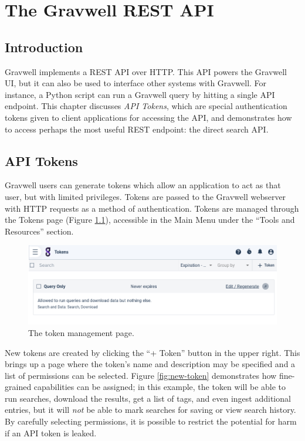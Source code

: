 \chapter{The Gravwell REST API}
\section{Introduction}
Gravwell implements a REST API over HTTP. This API powers the Gravwell UI, but it can also be used to interface other systems with Gravwell. For instance, a Python script can run a Gravwell query by hitting a single API endpoint. This chapter discusses \emph{API Tokens}, which are special authentication tokens given to client applications for accessing the API, and demonstrates how to access perhaps the most useful REST endpoint: the direct search API.

\section{API Tokens}
Gravwell users can generate tokens which allow an application to act as that user, but with limited privileges. Tokens are passed to the Gravwell webserver with HTTP requests as a method of authentication. Tokens are managed through the Tokens page (Figure \ref{fig:token-page}), accessible in the Main Menu under the ``Tools and Resources'' section.

\begin{figure}
	\includegraphics[width=0.8\linewidth]{images/token-page.png}
	\caption{The token management page.}
	\label{fig:token-page}
\end{figure}

New tokens are created by clicking the ``+ Token'' button in the upper right. This brings up a page where the token's name and description may be specified and a list of permissions can be selected. Figure \ref{fig:new-token} demonstrates how fine-grained capabilities can be assigned; in this example, the token will be able to run searches, download the results, get a list of tags, and even ingest additional entries, but it will \emph{not} be able to mark searches for saving or view search history. By carefully selecting permissions, it is possible to restrict the potential for harm if an API token is leaked.

